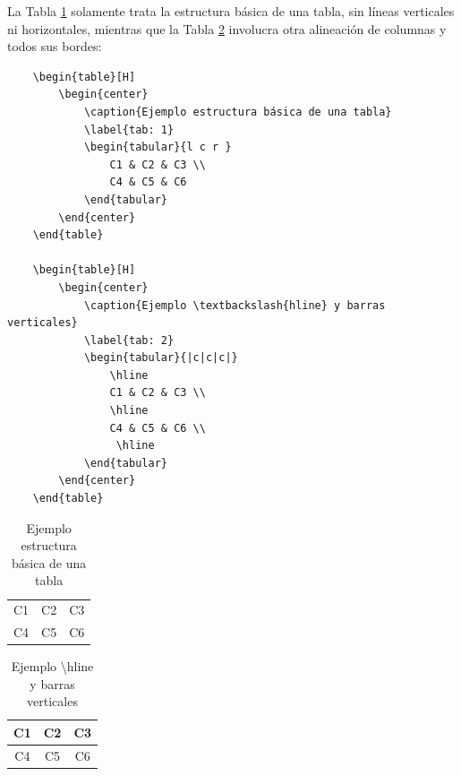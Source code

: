 La Tabla \ref{tab: 1} solamente trata la estructura básica de una tabla, sin líneas verticales ni horizontales, mientras que la Tabla \ref{tab: 2} involucra otra alineación de columnas y todos sus bordes:
\begin{lstlisting}
    \begin{table}[H]
        \begin{center}
            \caption{Ejemplo estructura básica de una tabla}
            \label{tab: 1}
            \begin{tabular}{l c r }
                C1 & C2 & C3 \\
                C4 & C5 & C6 
            \end{tabular}
        \end{center}
    \end{table}
    
    \begin{table}[H]
        \begin{center}
            \caption{Ejemplo \textbackslash{hline} y barras verticales}
            \label{tab: 2}
            \begin{tabular}{|c|c|c|}
                \hline
                C1 & C2 & C3 \\
                \hline
                C4 & C5 & C6 \\
                 \hline
            \end{tabular}
        \end{center}
    \end{table}
\end{lstlisting}
\begin{table}[H]
    \begin{center}
        \caption{Ejemplo estructura básica de una tabla}
        \label{tab: 1}
        \begin{tabular}{l c r }
            C1 & C2 & C3 \\
            C4 & C5 & C6 
        \end{tabular}
    \end{center}
\end{table}

\begin{table}[H]
    \begin{center}
        \caption{Ejemplo \textbackslash{hline} y barras verticales}
        \label{tab: 2}
        \begin{tabular}{|c|c|c|}
            \hline
            C1 & C2 & C3 \\
            \hline
            C4 & C5 & C6 \\
             \hline
        \end{tabular}
    \end{center}
\end{table}

